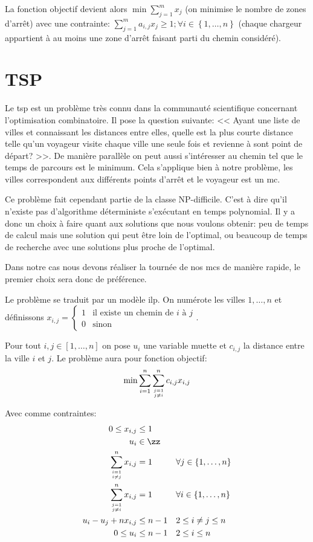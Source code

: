 \documentclass[final]{polytech/polytech}
\begin{document}
		 La fonction objectif devient alors $\min\sum_{j=1}^mx_j$ (on minimise le nombre de zones d'arrêt) avec une contrainte: $\sum_{j=1}^ma_{i,j}x_j\geq 1; \forall i\in \left\{1, \dots ,n\right\}$ (chaque chargeur appartient à au moins une zone d'arrêt faisant parti du chemin considéré).
		 
	\section{TSP}
		Le \gls{tsp} \cite{wiki:tsp} est un problème très connu dans la communauté scientifique concernant l'optimisation combinatoire.
		Il pose la question suivante: << Ayant une liste de villes et connaissant les distances entre elles, quelle est la plus courte distance telle qu'un voyageur visite chaque ville une seule fois et revienne à sont point de départ? >>.
		De manière parallèle on peut aussi s'intéresser au chemin tel que le temps de parcours est le minimum.
		Cela s'applique bien à notre problème, les villes correspondent aux différents points d'arrêt et le voyageur est un \gls{mc}.
		
		Ce problème fait cependant partie de la classe NP-difficile.
		C'est à dire qu'il n'existe pas d'algorithme déterministe s'exécutant en temps polynomial.
		Il y a donc un choix à faire quant aux solutions que nous voulons obtenir: peu de temps de calcul mais une solution qui peut être loin de l'optimal, ou beaucoup de temps de recherche avec une solutions plus proche de l'optimal.
		
		Dans notre cas nous devons réaliser la tournée de nos \glspl{mc} de manière rapide, le premier choix sera donc de préférence.
		
		Le problème se traduit par un modèle \gls{ilp}.
		On numérote les villes $1, \dots, n$ et définissons $x_{i,j}=\left\{\begin{array}{ll}
				1 & \text{il existe un chemin de } i \text{ à }j\\
				0 & \text{sinon}
			\end{array}\right.$.
			
		Pour tout $i,j\in\left[1,\dots,n\right]$ on pose $u_i$ une variable muette et $c_{i,j}$ la distance entre la ville $i$ et $j$.
		Le problème aura pour fonction objectif:
		\begin{align}
			\label{eq:eq1}
			\min\sum_{i=1}^n\sum_{j=1\atop j\neq i}^n c_{i,j}x_{i,j}
		\end{align}
		
		Avec comme contraintes:
		\begin{align}
			\label{eq:eq2}
			0 \leq x_{i,j} &\leq 1 &&\\
			u_i&\in\zz &&\nonumber \\
			\label{eq:eq3}
			\sum_{i=1\atop i\neq j}^n x_{i,j} &= 1 && \forall j\in \left\{ 1, \dots , n\right\}\\
			\label{eq:eq4}
			\sum_{j=1\atop j\neq i}^n x_{i,j} &= 1 && \forall i\in \left\{ 1, \dots , n\right\}\\
			\label{eq:eq5}
			u_i-u_j+nx_{i,j}&\leq n-1 && 2\leq i\neq j\leq n \\
			\label{eq:eq6}
			0\leq u_i &\leq n-1 && 2\leq i\leq n
		\end{align}
		
\end{document}

